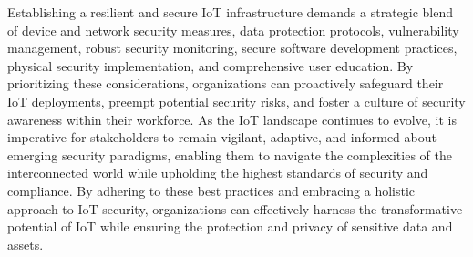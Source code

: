 \documentclass[conference]{IEEEtran}
\begin{document}
Establishing a resilient and secure IoT infrastructure demands a strategic blend of device and network security measures, data protection protocols, vulnerability management, robust security monitoring, secure software development practices, physical security implementation, and comprehensive user education. By prioritizing these considerations, organizations can proactively safeguard their IoT deployments, preempt potential security risks, and foster a culture of security awareness within their workforce. As the IoT landscape continues to evolve, it is imperative for stakeholders to remain vigilant, adaptive, and informed about emerging security paradigms, enabling them to navigate the complexities of the interconnected world while upholding the highest standards of security and compliance. By adhering to these best practices and embracing a holistic approach to IoT security, organizations can effectively harness the transformative potential of IoT while ensuring the protection and privacy of sensitive data and assets.
\end{document}
